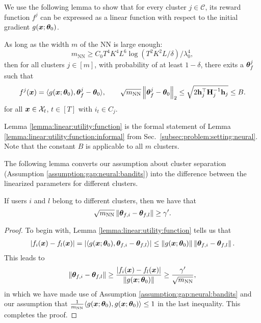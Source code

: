 We use the following lemma to show that for every cluster $j\in\mathcal{C}$, its reward function $f^j$ can be expressed as a linear function with respect to the initial gradient $g(\boldsymbol{x};\boldsymbol{\theta}_0)$.
\begin{lemma}
\label{lemma:linear:utility:function}
As long as the width $m$ of the NN is large enough:
\[
	m_{\text{NN}} \geq C_0 T^4K^4 L^6\log(T^2K^2 L/\delta) / \lambda_0^4,
\]
then for all clusters $j\in[m]$, with probability of at least $1-\delta$, there exits a $\boldsymbol{\theta}^j_{f}$ such that 
\[ 
	f^j(\boldsymbol{x}) = \langle g(\boldsymbol{x};\boldsymbol{\theta}_0), \boldsymbol{\theta}^j_{f} - \boldsymbol{\theta}_0 \rangle, \qquad \sqrt{m_{\text{NN}}} \left\| \boldsymbol{\theta}^j_{f} - \boldsymbol{\theta}_0 \right\|_2 \leq \sqrt{2\mathbf{h}_j^{\top} \mathbf{H}_j^{-1} \mathbf{h}_j} \leq B.
\]
for all $\boldsymbol{x}\in\mathcal{X}_{t}$, $t\in[T]$ with $i_t\in C_{j}$.
\end{lemma}

Lemma \ref{lemma:linear:utility:function} is the formal statement of Lemma \ref{lemma:linear:utility:function:informal} from Sec.~\ref{subsec:problem:setting:neural}.
Note that the constant $B$ is applicable to all $m$ clusters.

The following lemma converts our assumption about cluster separation (Assumption \ref{assumption:gap:neural:bandits}) into the difference between the linearized parameters for different clusters.
\begin{lemma}
\label{lemma:neural:gap:theta}
If users $i$ and $l$ belong to different clusters, then we have that
\[
\sqrt{m_{\text{NN}}} \left\| \boldsymbol{\theta}_{f,i} - \boldsymbol{\theta}_{f,l} \right\| \geq \gamma'.
\]
\end{lemma}
\begin{proof}
To begin with, Lemma \ref{lemma:linear:utility:function} tells us that
\begin{equation}
\begin{split}
|f_i(\boldsymbol{x}) - f_l(\boldsymbol{x})| = | \langle g(\boldsymbol{x};\boldsymbol{\theta}_0),  \boldsymbol{\theta}_{f,i} - \boldsymbol{\theta}_{f,l}\rangle | \leq \left\| g(\boldsymbol{x};\boldsymbol{\theta}_0) \right\| \left\| \boldsymbol{\theta}_{f,i} - \boldsymbol{\theta}_{f,l} \right\|.
\end{split}
\end{equation}
This leads to
\begin{equation}
\begin{split}
\left\| \boldsymbol{\theta}_{f,i} - \boldsymbol{\theta}_{f,l} \right\| \geq \frac{|f_i(\boldsymbol{x}) - f_l(\boldsymbol{x})|}{\left\| g(\boldsymbol{x};\boldsymbol{\theta}_0) \right\|} \geq \frac{\gamma'}{\sqrt{m_{\text{NN}}}} ,
\end{split}
\end{equation}
in which we have made use of Assumption \ref{assumption:gap:neural:bandits} and our assumption that $\frac{1}{m_{\text{NN}}}\langle g(\boldsymbol{x};\boldsymbol{\theta}_0), g(\boldsymbol{x};\boldsymbol{\theta}_0) \rangle \leq 1$ in the last inequality.
This completes the proof.
\end{proof}

